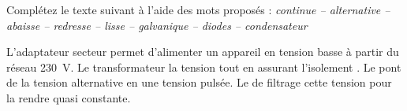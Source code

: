 \documentclass[11pt]{article}
\begin{document}
\begin{exercice}
Complétez le texte suivant à l'aide des mots proposés :
\textit{continue -- alternative -- abaisse -- redresse -- lisse -- galvanique -- diodes -- condensateur}

L'adaptateur secteur permet d'alimenter un appareil en tension \underline{\hspace{3cm}} basse à partir du réseau \underline{\hspace{3cm}} \SI{230}{V}. Le transformateur \underline{\hspace{3cm}} la tension tout en assurant l'isolement \underline{\hspace{3cm}}. Le pont de \underline{\hspace{3cm}} \underline{\hspace{3cm}} la tension alternative en une tension \underline{\hspace{3cm}} pulsée. Le \underline{\hspace{3cm}} de filtrage \underline{\hspace{3cm}} cette tension pour la rendre quasi constante.
\end{exercice}
\end{document}
